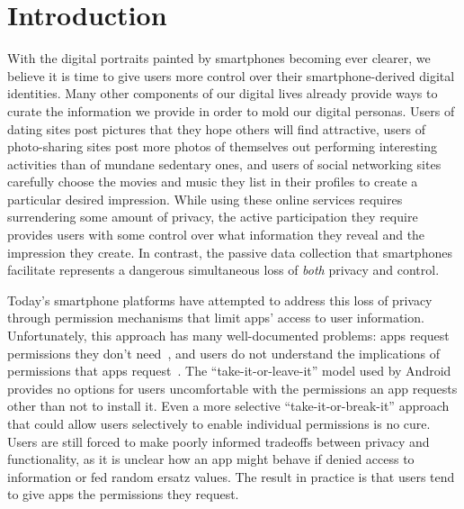 
\section{Introduction} \label{sec-introduction}

With the digital portraits painted by smartphones becoming ever clearer, we
believe it is time to give users more control over their smartphone-derived
digital identities. Many other components of our digital lives already provide
ways to curate the information we provide in order to mold our digital
personas. Users of dating sites post pictures that they hope others will find
attractive, users of photo-sharing sites post more photos of themselves out
performing interesting activities than of mundane sedentary ones, and users of
social networking sites carefully choose the movies and music they list in
their profiles to create a particular desired impression. While using these
online services requires surrendering some amount of privacy, the active
participation they require provides users with some control over what
information they reveal and the impression they create. In contrast, the
passive data collection that smartphones facilitate represents a dangerous
simultaneous loss of \textit{both} privacy and control.


Today's smartphone platforms have attempted to address this loss of privacy
through permission mechanisms that limit apps' access to user information.
Unfortunately, this approach has many well-documented problems: apps request
permissions they don't need~\cite{taintdroid-osdi,demystified-ccs11}, and users
do not understand the implications of permissions that apps
request~\cite{androidperms-soups12}. The ``take-it-or-leave-it'' model used by
Android provides no options for users uncomfortable with the permissions an app
requests other than not to install it. Even a more selective
``take-it-or-break-it'' approach~\cite{apex-asiaccs10} that could allow users
selectively to enable individual permissions is no cure.  Users are still
forced to make poorly informed tradeoffs between privacy and functionality, as
it is unclear how an app might behave if denied access to information or fed
random ersatz values. The result in practice is that users tend to give apps
the permissions they request.

